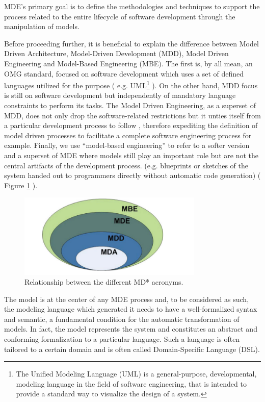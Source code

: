 MDE's primary goal is to define the methodologies and techniques to support the process related to the entire lifecycle of software development through the manipulation of models.

Before proceeding further, it is beneficial to explain the difference between Model Driven Architecture, Model-Driven Development (MDD), Model Driven Engineering and Model-Based Engineering (MBE).
The first is, by all mean, an OMG standard, focused on software development which uses a set of defined languages utilized for the purpose ( e.g. UML\footnote{The Unified Modeling Language (UML) is a general-purpose, developmental, modeling language in the field of software engineering, that is intended to provide a standard way to visualize the design of a system.} ). On the other hand, MDD focus is still on software development but independently of mandatory language constraints to perform its tasks.
The Model Driven Engineering, as a superset of MDD, does not only drop the software-related restrictions but it unties itself from a particular development process to follow , therefore expediting the definition of model driven processes to facilitate  a complete software engineering process for example. 
Finally, we use “model-based engineering” to refer to a softer version and a superset of MDE where models still play an important role but are not the central artifacts of the development process. (e.g. blueprints or sketches of the system handed out to programmers directly without automatic code generation) ( Figure \ref{fig:mda} ).

\vspace{0cm}
\begin{figure}[htbp]
  \centering
    \includegraphics[height=4cm]{images/mda}
  \caption{Relationship between the different MD* acronyms.}
  \label{fig:mda}
\end{figure}
\vspace{0cm}

The model is at the center of any MDE process and, to be considered as such, the modeling language which generated it needs to have a well-formalized syntax and semantic, a fundamental condition for the automatic transformation of models. In fact, the model represents the system and constitutes an abstract and conforming formalization to a particular language. Such a language is often tailored to a certain domain and is often called Domain-Specific Language (DSL). 


